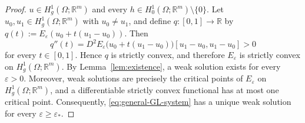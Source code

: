 \documentclass[10pt,a4paper]{amsart}
\newcommand{\R}{\mathbb{R}}
\begin{document}
\begin{proof}
	$u\in H_g^1(\Omega;\R^m)$ and every
	$h\in H_0^1(\Omega;\R^m)\setminus\{0\}$. Let
	$u_0,u_1\in H_g^1(\Omega;\R^m)$ with $u_0\neq u_1$, and define
	$q\colon[0,1]\to\R$ by
	$q(t):=E_\varepsilon(u_0+t(u_1-u_0))$. Then
	\[
		q''(t)
		=
		D^2E_\varepsilon
		\bigl(u_0+t(u_1-u_0)\bigr)
		[u_1-u_0,u_1-u_0]
		>
		0
	\]
	for every $t\in[0,1]$. Hence $q$ is strictly convex, and therefore
	$E_\varepsilon$ is strictly convex on $H_g^1(\Omega;\R^m)$.
	By Lemma~\ref{lem:existence}, a weak solution exists for every
	$\varepsilon>0$. Moreover, weak solutions are precisely the critical
	points of $E_\varepsilon$ on $H_g^1(\Omega;\R^m)$, and a
	differentiable strictly convex functional has at most one critical
	point. Consequently, \eqref{eq:general-GL-system} has a unique weak
	solution for every $\varepsilon\geq\varepsilon_*$.

\end{proof}
\end{document}

